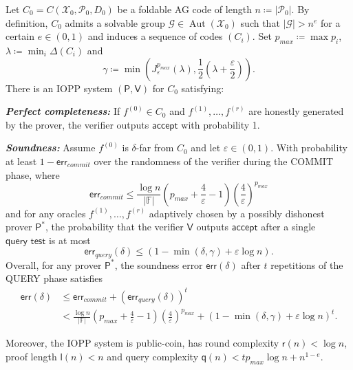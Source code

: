 \documentclass[10pt,a4paper]{article}
\renewcommand\epsilon{\varepsilon}
\newcommand\F{\mathbb{F}}
\DeclareMathOperator{\Aut}{Aut}
\newcommand\prover{\mathsf{P}}
\newcommand\verifier{\mathsf{V}}
\newcommand{\size}[1]{\left|#1\right|}
\newcommand\calX{\mathcal{X}}
\newcommand\calP{\mathcal{P}}
\newcommand\calG{\mathcal{G}}
\newcommand{\err}{\textsf{err}}
\newcommand\mydef{\coloneqq}
\theoremstyle{plain}
\theoremstyle{plain}
\theoremstyle{definition}
\theoremstyle{remark}
\theoremstyle{plain}
\begin{document}
\begin{theorem}\label{thm:properties}
	Let ${C_0 = C(\calX_0, \calP_0, D_0)}$ be a foldable AG code of length $n \mydef \size{\calP_0}$. By definition, $C_0$ admits a solvable group $\calG \in \Aut(\calX_0)$ such that $\size{\calG} > n^e$ for a certain $e \in (0,1)$ and induces a sequence of codes $(C_i)$. Set $p_{max}\mydef \max p_i$, ${\lambda \mydef \min_i \Delta(C_i)}$ and \[\gamma \mydef \min\left(J_{\epsilon}^{p_{max}}(\lambda), \frac{1}{2}(\lambda + \frac{\epsilon}{2})\right).\]
	There is an IOPP system $(\prover, \verifier)$ for $C_0$ satisfying:
	\begin{description}
		\item \textbf{\emph{Perfect completeness:}} If $f^{(0)} \in C_0$ and $f^{(1)}, \dots, f^{(r)}$ are honestly generated by the prover, the verifier outputs $\mathsf{accept}$ with probability 1.
		\item \emph{\textbf{Soundness:}} Assume $f^{(0)}$ is $\delta$-far from $C_0$ and let $\epsilon \in (0,1)$. With probability  at least $1 - \err_{commit}$ over the randomness of the verifier during the \textsf{COMMIT} phase, where 
		\[
		\err_{commit} \leq \frac{\log n}{\size \F}\left(p_{max} + \frac{4}{\epsilon} - 1\right)\left(\frac{4}{\epsilon}\right)^{p_{max}}
		\] 
		and for any oracles $f^{(1)}, \ldots, f^{(r)}$ adaptively chosen by a possibly dishonest prover $\prover^*$, the probability that the verifier $\verifier$ outputs $\mathsf{accept}$ after a single $\textsf{query test}$ is at most
		\[
		\err_{query}(\delta) \leq (1 - \min(\delta, \gamma) + \epsilon \log n).
		\]        
		Overall, for any prover $\prover^*$, the soundness error
		$\err(\delta)$ after $t$ repetitions of the \textsf{QUERY} phase satisfies
		\begin{align*}
			\err(\delta) &\leq \err_{commit} + \left(\err_{query}(\delta)\right)^t\\
			&< \frac{\log n}{\size \F}\left(p_{max} + \frac{4}{\epsilon} - 1\right)\left(\frac{4}{\epsilon}\right)^{p_{max}} + (1 - \min(\delta, \gamma) + \epsilon\log n)^t.
		\end{align*}
	\end{description}
	
	Moreover, the IOPP system is public-coin, has round complexity $\mathsf{r}(n) < \log n$, proof length $\mathsf{l}(n) < n$ and query complexity ${\mathsf{q}(n) < t p_{max}\log n + n^{1 - e}}$.
\end{theorem}
\end{document}
